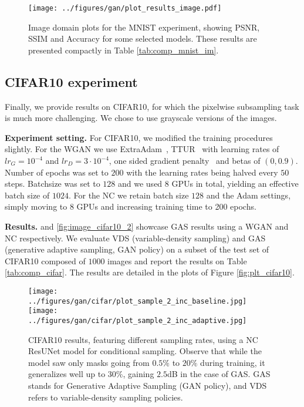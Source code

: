 \begin{figure}[!ht]
\centering
\texttt{[image: ../figures/gan/plot\_results\_image.pdf]}
\caption{Image domain plots for the MNIST experiment, showing PSNR, SSIM and Accuracy for some selected models. These results are presented compactly in Table \ref{tab:comp_mnist_im}.}\label{fig:plt_mnist_image}
\end{figure}

\clearpage
\FloatBarrier


\subsection{CIFAR10 experiment}\label{app:s_cifar}
Finally, we provide results on CIFAR10, for which the pixelwise subsampling task is much more challenging. We chose to use grayscale versions of the images. 

\textbf{Experiment setting.} For CIFAR10, we modified the training procedures slightly. For the WGAN we use ExtraAdam~\citep{gidel2018variational}, TTUR~\citep{heusel2017gans} with learning rates of $lr_G=10^{-4}$ and $lr_D=3\cdot 10^{-4}$, one sided gradient penalty~\citep{petzka2018on} and betas of $(0,0.9)$. Number of epochs was set to $200$ with the learning rates being halved every $50$ steps. Batchsize was set to $128$ and we used 8 GPUs in total, yielding an effective batch size of $1024$.  
For the NC we retain batch size $128$ and the Adam settings, simply moving to 8 GPUs and increasing training time to 200 epochs. 

\textbf{Results.}  and \cref{fig:image_cifar10_2} showcase GAS results using a WGAN and NC respectively. We evaluate VDS (variable-density sampling) and GAS (generative adaptive sampling, GAN policy) on a subset of the test set of CIFAR10 composed of $1000$ images and report the results on Table \ref{tab:comp_cifar}. The results are detailed in the plots of Figure \ref{fig:plt_cifar10}.

%


\begin{figure}[!ht]
    \centering
    \texttt{[image: ../figures/gan/cifar/plot\_sample\_2\_inc\_baseline.jpg]}
    \texttt{[image: ../figures/gan/cifar/plot\_sample\_2\_inc\_adaptive.jpg]}
\caption{CIFAR10 results, featuring different sampling rates, using a NC ResUNet model for conditional sampling. Observe that while the model saw only masks going from $0.5\%$ to $20\%$ during training, it generalizes well up to $30\%$, gaining $2.5$dB in the case of GAS.  GAS stands for Generative Adaptive Sampling (GAN policy), and VDS refers to variable-density sampling policies.}\label{fig:image_cifar10_1}
\end{figure}

